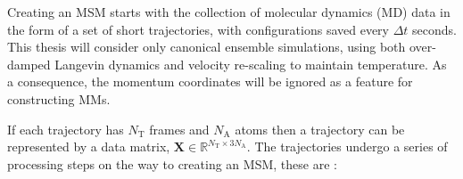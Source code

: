 Creating an MSM starts with the collection of molecular dynamics (MD) data in the form of a set of short trajectories, with configurations saved every $\Delta t$ seconds. This thesis will consider only canonical ensemble simulations, using both over-damped Langevin dynamics \cite{ermakComputerSimulationCharged1974,ermakEquilibriumElectrostaticEffects1974} and velocity re-scaling \cite{bussiCanonicalSamplingVelocity2007} to maintain temperature. As a consequence, the momentum coordinates will be ignored as a feature for constructing MMs. 

If  each trajectory has $N_{\mathrm{T}}$ frames and $N_{\mathrm{A}}$ atoms then a trajectory can be represented by a data matrix, $\mathbf{X} \in \mathbb{R}^{N_{\mathrm{T}} \times 3N_{\mathrm{A}}}$. The trajectories  undergo a series of processing steps on the way to creating an MSM, these are \cite{noeMarkovModelsMolecular2019b, schererVariationalSelectionFeatures2019}: 
